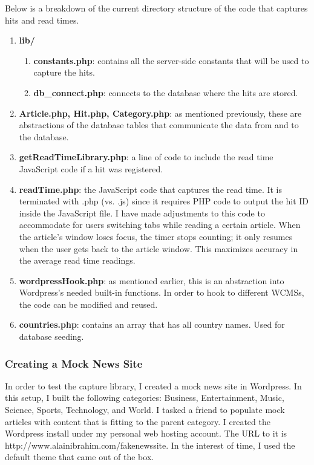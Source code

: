 \documentclass[12pt]{article}
\begin{document}
{\noindent Below is a breakdown of the current directory structure of the code that captures hits and read times.
\begin{enumerate}
\item \textbf{lib/}
\begin{enumerate}
\item \textbf{constants.php}: contains all the server-side constants that will be used to capture the hits.
\item \textbf{db\_connect.php}: connects to the database where the hits are stored.
\end{enumerate}
\item \textbf{Article.php, Hit.php, Category.php}: as mentioned previously, these are abstractions of the database tables that communicate the data from and to the database.
\item \textbf{getReadTimeLibrary.php}: a line of code to include the read time JavaScript code if a hit was registered.
\item \textbf{readTime.php}: the JavaScript code that captures the read time. It is terminated with .php (vs. .js) since it requires PHP code to output the hit ID inside the JavaScript file. I have made adjustments to this code to accommodate for users switching tabs while reading a certain article. When the article's window loses focus, the timer stops counting; it only resumes when the user gets back to the article window. This maximizes accuracy in the average read time readings.
\item \textbf{wordpressHook.php}: as mentioned earlier, this is an abstraction into Wordpress's needed built-in functions. In order to hook to different WCMSs, the code can be modified and reused. 
\item \textbf{countries.php}: contains an array that has all country names. Used for database seeding.
\end{enumerate}

\newpage

\subsubsection{Creating a Mock News Site} 
In order to test the capture library, I created a mock news site in Wordpress. In this setup, I built the following categories: Business, Entertainment, Music, Science, Sports, Technology, and World. I tasked a friend to populate mock articles with content that is fitting to the parent category. I created the Wordpress install under my personal web hosting account. The URL to it is http://www.alainibrahim.com/fakenewssite. In the interest of time, I used the default theme that came out of the box. \\

}
\end{document}
